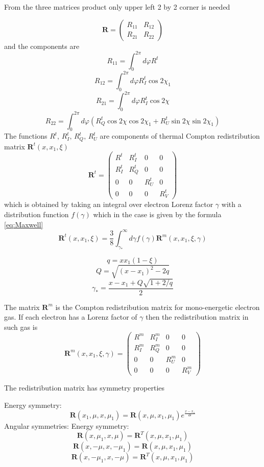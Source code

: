 \documentclass[iop, usenatbib]{emulateapj}
\newcommand{\be}{\begin{equation}}
\newcommand{\ee}{\end{equation}}
\begin{document}
From the three matrices product only upper left 2 by 2 corner is needed

\be
\bm{R}=
\left( {\begin{array}{cc}
    R_{11} & R_{12}  \\
    R_{21} & R_{22}  
    \end{array} } \right)
\ee
and the components are
$$
R_{11}=\int_0^{2\pi} d\varphi R^t 
$$$$
R_{12}=\int_0^{2\pi} d\varphi R^t_I\cos2\chi_1 
$$$$
R_{21}=\int_0^{2\pi} d\varphi R^t_I\cos2\chi 
$$$$
R_{22}=\int_0^{2\pi} d\varphi (R^t_Q\cos2\chi\cos2\chi_1 + R^t_U \sin2\chi\sin2\chi_1)
$$
The functions $R^t,\,R^t_I,\,R^t_Q,\,R^t_U$ are components of thermal Compton redistribution matrix $\bm{R}^t(x,x_1,\xi)$ 
\be
\bm{R}^t= 
\left( {\begin{array}{cccc}
    R^t & R^t_I & 0 & 0 \\
     R^t_I &  R^t_Q & 0 & 0 \\
    0 & 0 &  R^t_U & 0 \\
    0 & 0 & 0 &  R^t_V  
   \end{array} } \right)
\ee
which is obtained by taking an integral over electron Lorenz factor $\gamma$ with a distribution function $f(\gamma)$ which
in the case is given by the formula \eqref{eq:Maxwell}
\be
\bm{R}^t(x,x_1,\xi)=\frac38\int_{\gamma_*}^\infty d\gamma
f(\gamma)\bm{R}^m(x,x_1,\xi,\gamma)
\ee

$$
q=xx_1(1-\xi)$$$$
Q=\sqrt{(x-x_1)^2-2q}
$$
\be
\gamma_*=\frac{x-x_1+Q\sqrt{1+2/q}}2
\ee

The matrix $\bm{R}^m$ is the Compton redistribution matrix for mono-energetic electron gas. If each electron has a Lorenz factor of $\gamma$ then the redistribution matrix in such gas is
\be
\bm{R}^m(x,x_1,\xi,\gamma)= 
\left( {\begin{array}{cccc}
    R^m & R^m_I & 0 & 0 \\
     R^m_I &  R^m_Q & 0 & 0 \\
    0 & 0 &  R^m_U & 0 \\
    0 & 0 & 0 &  R^m_V  
   \end{array} } \right)
\ee



The redistribution matrix has symmetry properties

Energy symmetry:\be
\bm{R}(x_1,\mu,x,\mu_1)=\bm{R}(x,\mu,x_1,\mu_1) e^\frac{x-x_1}\Theta \ee
Angular symmetries:
Energy symmetry:\be
\bm{R}(x,\mu_1,x,\mu)=\bm{R}^T(x,\mu,x_1,\mu_1) \ee
\be
\bm{R}(x,-\mu,x,-\mu_1)=\bm{R}(x,\mu,x_1,\mu_1) \ee
\be
\bm{R}(x,-\mu_1,x,-\mu)=\bm{R}^T(x,\mu,x_1,\mu_1) \ee
\end{document}
